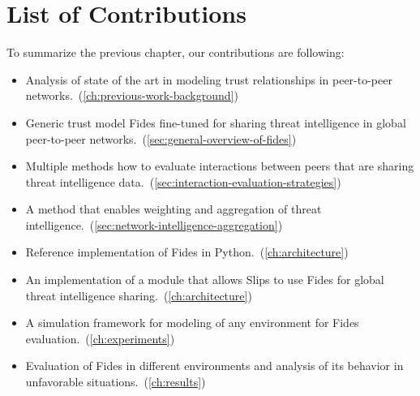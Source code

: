 \section{List of Contributions}
\label{sec:list-of-contributions}
\noindent
To summarize the previous chapter, our contributions are following:
\begin{itemize}
    \item Analysis of state of the art in modeling trust relationships in peer-to-peer networks.~(\ref{ch:previous-work-background})
    \item Generic trust model Fides fine-tuned for sharing threat intelligence in global peer-to-peer networks.~(\ref{sec:general-overview-of-fides})
    \item Multiple methods how to evaluate interactions between peers that are sharing threat intelligence data.~(\ref{sec:interaction-evaluation-strategies})
    \item A method that enables weighting and aggregation of threat intelligence.~(\ref{sec:network-intelligence-aggregation})
    \item Reference implementation of Fides in Python.~(\ref{ch:architecture})
    \item An implementation of a module that allows Slips to use Fides for global threat intelligence sharing.~(\ref{ch:architecture})
    \item A simulation framework for modeling of any environment for Fides evaluation.~(\ref{ch:experiments})
    \item Evaluation of Fides in different environments and analysis of its behavior in unfavorable situations.~(\ref{ch:results})
\end{itemize}